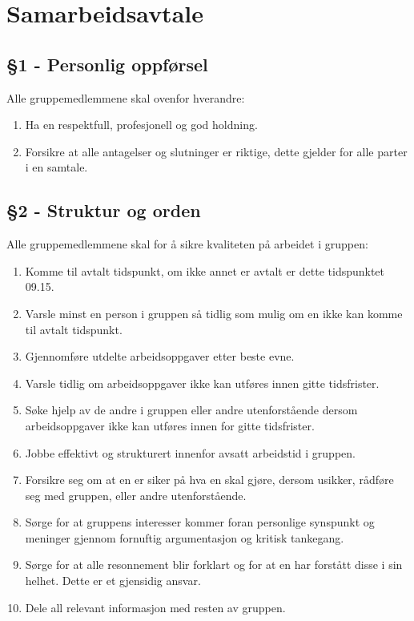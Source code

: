 \chapter{Samarbeidsavtale}
\section*{§1 - Personlig oppførsel}
Alle gruppemedlemmene skal ovenfor hverandre:
\begin{enumerate}
\item Ha en respektfull, profesjonell og god holdning.
\item Forsikre at alle antagelser og slutninger er riktige, dette gjelder for alle parter i en samtale.
\end{enumerate}
\section*{§2 - Struktur og orden}
Alle gruppemedlemmene skal for å sikre kvaliteten på arbeidet i gruppen:
\begin{enumerate}
\item Komme til avtalt tidspunkt, om ikke annet er avtalt er dette tidspunktet 09.15.
\item Varsle minst en person i gruppen så tidlig som mulig om en ikke kan komme til avtalt tidspunkt.
\item Gjennomføre utdelte arbeidsoppgaver etter beste evne.
\item Varsle tidlig om arbeidsoppgaver ikke kan utføres innen gitte tidsfrister. 
\item Søke hjelp av de andre i gruppen eller andre utenforstående dersom arbeidsoppgaver ikke kan utføres innen for gitte tidsfrister.
\item Jobbe effektivt og strukturert innenfor avsatt arbeidstid i gruppen.
\item Forsikre seg om at en er siker på hva en skal gjøre, dersom usikker, rådføre seg med gruppen, eller andre utenforstående.
\item Sørge for at gruppens interesser kommer foran personlige synspunkt og meninger gjennom fornuftig argumentasjon og kritisk tankegang.
\item Sørge for at alle resonnement blir forklart og for at en har forstått disse i sin helhet. Dette er et gjensidig ansvar.
\item Dele all relevant informasjon med resten av gruppen.
\end{enumerate}
